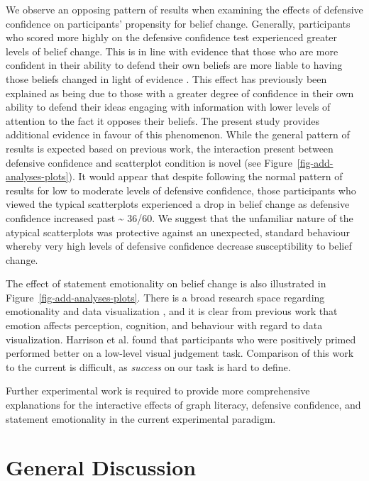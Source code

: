 \documentclass[manuscript,screen,review,anonymous]{acmart}
\begin{document}
We observe an opposing pattern of results when examining the effects of
defensive confidence on participants' propensity for belief change.
Generally, participants who scored more highly on the defensive
confidence test experienced greater levels of belief change. This is in
line with evidence that those who are more confident in their ability to
defend their own beliefs are more liable to having those beliefs changed
in light of evidence \citep{albarracin_2004}. This effect has previously
been explained as being due to those with a greater degree of confidence
in their own ability to defend their ideas engaging with information
with lower levels of attention to the fact it opposes their beliefs. The
present study provides additional evidence in favour of this phenomenon.
While the general pattern of results is expected based on previous work,
the interaction present between defensive confidence and scatterplot
condition is novel (see Figure~\ref{fig-add-analyses-plots}). It would
appear that despite following the normal pattern of results for low to
moderate levels of defensive confidence, those participants who viewed
the typical scatterplots experienced a drop in belief change as
defensive confidence increased past \textasciitilde{} 36/60. We suggest
that the unfamiliar nature of the atypical scatterplots was protective
against an unexpected, standard behaviour whereby very high levels of
defensive confidence decrease susceptibility to belief change.

The effect of statement emotionality on belief change is also
illustrated in Figure~\ref{fig-add-analyses-plots}. There is a broad
research space regarding emotionality and data visualization
\citep{lan_2023}, and it is clear from previous work that emotion
affects perception, cognition, and behaviour
\citep{phelps_2006, harrison_2013, thoresen_2016} with regard to data
visualization. Harrison et al. \citep{harrison_2013} found that
participants who were positively primed performed better on a low-level
visual judgement task. Comparison of this work to the current is
difficult, as \emph{success} on our task is hard to define.

Further experimental work is required to provide more comprehensive
explanations for the interactive effects of graph literacy, defensive
confidence, and statement emotionality in the current experimental
paradigm.

\section{General Discussion}\label{sec-general-discussion}
\end{document}

